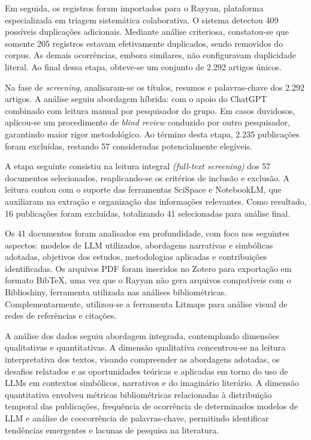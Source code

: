 \documentclass[portuguese]{textolivre}
\begin{document}
Em seguida, os registros foram importados para o Rayyan, plataforma especializada em triagem sistemática colaborativa. O sistema detectou 409 possíveis duplicações adicionais. Mediante análise criteriosa, constatou-se que somente 205 registros estavam efetivamente duplicados, sendo removidos do corpus. As demais ocorrências, embora similares, não configuravam duplicidade literal. Ao final dessa etapa, obteve-se um conjunto de 2.292 artigos únicos.

Na fase de \textit{screening}, analisaram-se os títulos, resumos e palavras-chave dos 2.292 artigos. A análise seguiu abordagem híbrida: com o apoio do ChatGPT combinado com leitura manual por pesquisador do grupo. Em casos duvidosos, aplicou-se um procedimento de \textit{blind review} conduzido por outro pesquisador, garantindo maior rigor metodológico. Ao término desta etapa, 2.235 publicações foram excluídas, restando 57 consideradas potencialmente elegíveis.

A etapa seguinte consistiu na leitura integral \textit{(full-text screening)} dos 57 documentos selecionados, reaplicando-se os critérios de inclusão e exclusão. A leitura contou com o suporte das ferramentas SciSpace e NotebookLM, que auxiliaram na extração e organização das informações relevantes. Como resultado, 16 publicações foram excluídas, totalizando 41 selecionadas para análise final.

Os 41 documentos foram analisados em profundidade, com foco nos seguintes aspectos: modelos de LLM utilizados, abordagens narrativas e simbólicas adotadas, objetivos dos estudos, metodologias aplicadas e contribuições identificadas. Os arquivos PDF foram inseridos no Zotero para exportação em formato BibTeX, uma vez que o Rayyan não gera arquivos compatíveis com o Biblioshiny, ferramenta utilizada nas análises bibliométricas. Complementarmente, utilizou-se a ferramenta Litmaps para análise visual de redes de referências e citações.

A análise dos dados seguiu abordagem integrada, contemplando dimensões qualitativas e quantitativas. A dimensão qualitativa concentrou-se na leitura interpretativa dos textos, visando compreender as abordagens adotadas, os desafios relatados e as oportunidades teóricas e aplicadas em torno do uso de LLMs em contextos simbólicos, narrativos e do imaginário literário. A dimensão quantitativa envolveu métricas bibliométricas relacionadas à distribuição temporal das publicações, frequência de ocorrência de determinados modelos de LLM e análise de coocorrência de palavras-chave, permitindo identificar tendências emergentes e lacunas de pesquisa na literatura.
\end{document}
